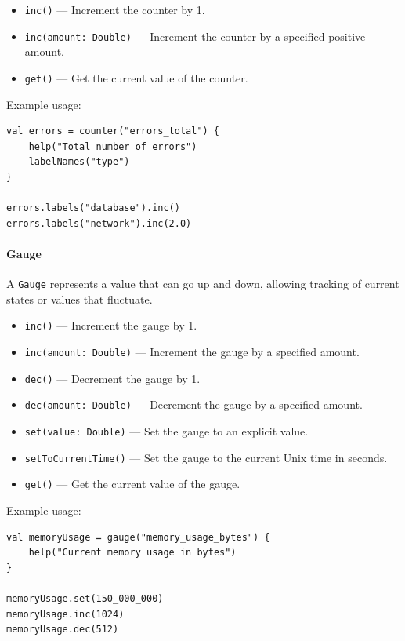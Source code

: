 \begin{itemize}
    \item \texttt{inc()} — Increment the counter by 1.
    \item \texttt{inc(amount: Double)} — Increment the counter by a specified positive amount.
    \item \texttt{get()} — Get the current value of the counter.
\end{itemize}

Example usage:

\begin{lstlisting}
val errors = counter("errors_total") {
    help("Total number of errors")
    labelNames("type")
}

errors.labels("database").inc()
errors.labels("network").inc(2.0)
\end{lstlisting}

\paragraph{Gauge}

A \texttt{Gauge} represents a value that can go up and down, allowing tracking of current states or values that fluctuate.

\begin{itemize}
    \item \texttt{inc()} — Increment the gauge by 1.
    \item \texttt{inc(amount: Double)} — Increment the gauge by a specified amount.
    \item \texttt{dec()} — Decrement the gauge by 1.
    \item \texttt{dec(amount: Double)} — Decrement the gauge by a specified amount.
    \item \texttt{set(value: Double)} — Set the gauge to an explicit value.
    \item \texttt{setToCurrentTime()} — Set the gauge to the current Unix time in seconds.
    \item \texttt{get()} — Get the current value of the gauge.
\end{itemize}

Example usage:

\begin{lstlisting}
val memoryUsage = gauge("memory_usage_bytes") {
    help("Current memory usage in bytes")
}

memoryUsage.set(150_000_000)
memoryUsage.inc(1024)
memoryUsage.dec(512)
\end{lstlisting}

